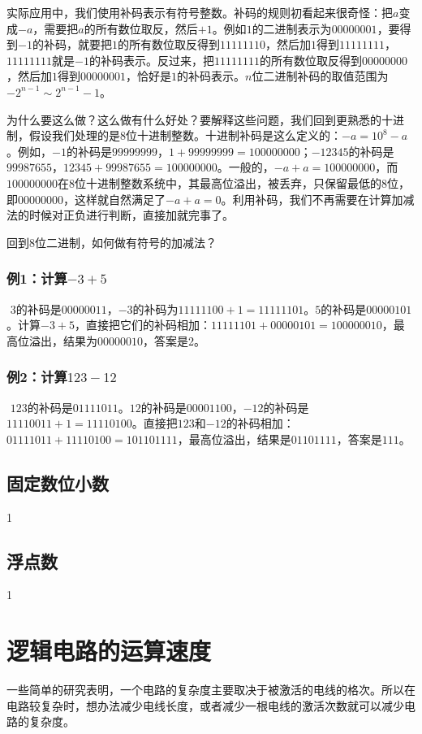 实际应用中，我们使用补码表示有符号整数。补码的规则初看起来很奇怪：把$a$变成$-a$，需要把$a$的所有数位取反，然后$+1$。例如$1$的二进制表示为$00000001$，要得到$-1$的补码，就要把$1$的所有数位取反得到$11111110$，然后加$1$得到$11111111$，\phantom{} $11111111$就是$-1$的补码表示。反过来，把$11111111$的所有数位取反得到$00000000$，然后加$1$得到$00000001$，恰好是$1$的补码表示。$n$位二进制补码的取值范围为$-2^{n-1}\sim2^{n-1}-1$。

为什么要这么做？这么做有什么好处？要解释这些问题，我们回到更熟悉的十进制，假设我们处理的是8位十进制整数。十进制补码是这么定义的：$-a=10^8-a$。例如，$-1$的补码是$99999999$，$1+99999999=100000000$；$-12345$的补码是$99987655$，$12345+99987655=100000000$。一般的，$-a+a=100000000$，而$100000000$在8位十进制整数系统中，其最高位溢出，被丢弃，只保留最低的8位，即$00000000$，这样就自然满足了$-a+a=0$。利用补码，我们不再需要在计算加减法的时候对正负进行判断，直接加就完事了。

回到8位二进制，如何做有符号的加减法？
\subsubsection*{例1：计算$-3+5$}$ $
$3$的补码是$00000011$，$-3$的补码为$11111100+1=11111101$。$5$的补码是$00000101$。计算$-3+5$，直接把它们的补码相加：$11111101+00000101=1 00000010$，最高位溢出，结果为$00000010$，答案是2。

\subsubsection*{例2：计算$123-12$}$ $
$123$的补码是$01111011$。$12$的补码是$00001100$，$-12$的补码是$11110011+1=11110100$。直接把$123$和$-12$的补码相加：$01111011+11110100=1 01101111$，最高位溢出，结果是$01101111$，答案是$111$。

\subsection{固定数位小数}
1
\subsection{浮点数}
1

\section{逻辑电路的运算速度}
一些简单的研究表明，一个电路的复杂度主要取决于被激活的电线的格次。所以在电路较复杂时，想办法减少电线长度，或者减少一根电线的激活次数就可以减少电路的复杂度。

